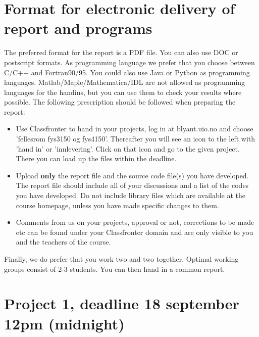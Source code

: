 \documentclass[11pt,a4wide]{article}
\begin{document}
\section*{Format for electronic delivery of report and programs}
%
The preferred format for the report is a PDF file. You can also
use DOC or postscript formats. 
As programming language we prefer that you choose between C/C++ and Fortran90/95.
You could also use Java or Python as programming languages. 
Matlab/Maple/Mathematica/IDL are not allowed as programming
languages for the handins, but you can use them to check your results where possible.
The following prescription should be followed when preparing the report:
\begin{itemize}
\item Use Classfronter to hand in your projects, log in  at 
blyant.uio.no and choose 'fellesrom fys3150 og fys4150'.
Thereafter you will see an icon to the left with 'hand in' or 'innlevering'.
Click on that icon and go to the given project. 
There you can load up the files within the deadline.
\item Upload {\bf only} the report file and the source code file(s) you have developed.
The report file should include all of your discussions and a list of the codes you have developed. 
Do not include library files which are available at the course homepage, unless you have
made specific changes to them.
\item Comments  from us on your projects, approval or not, corrections to be made 
etc can be found under
your Classfronter domain and are only visible to you and the teachers of the course.
 
\end{itemize}
Finally, 
we do prefer that you work two and two together. Optimal working groups consist of 
2-3 students. You can then hand in a common report. 

\section*{Project 1, deadline 18 september 12pm (midnight)}
\end{document}
